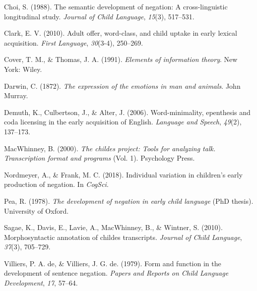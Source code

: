 \documentclass[10pt, letterpaper]{article}
\begin{document}
\leavevmode\hypertarget{ref-choi1988semantic}{}%
Choi, S. (1988). The semantic development of negation: A
cross-linguistic longitudinal study. \emph{Journal of Child Language},
\emph{15}(3), 517--531.

\leavevmode\hypertarget{ref-clark2010adult}{}%
Clark, E. V. (2010). Adult offer, word-class, and child uptake in early
lexical acquisition. \emph{First Language}, \emph{30}(3-4), 250--269.

\leavevmode\hypertarget{ref-cover_elements_1991}{}%
Cover, T. M., \& Thomas, J. A. (1991). \emph{Elements of information
theory}. New York: Wiley.

\leavevmode\hypertarget{ref-darwin1872expression}{}%
Darwin, C. (1872). \emph{The expression of the emotions in man and
animals}. John Murray.

\leavevmode\hypertarget{ref-demuth2006word}{}%
Demuth, K., Culbertson, J., \& Alter, J. (2006). Word-minimality,
epenthesis and coda licensing in the early acquisition of English.
\emph{Language and Speech}, \emph{49}(2), 137--173.

\leavevmode\hypertarget{ref-macwhinney2000childes}{}%
MacWhinney, B. (2000). \emph{The childes project: Tools for analyzing
talk. Transcription format and programs} (Vol. 1). Psychology Press.

\leavevmode\hypertarget{ref-nordmeyer2018individual}{}%
Nordmeyer, A., \& Frank, M. C. (2018). Individual variation in
children's early production of negation. In \emph{CogSci}.

\leavevmode\hypertarget{ref-pea1978}{}%
Pea, R. (1978). \emph{The development of negation in early child
language} (PhD thesis). University of Oxford.

\leavevmode\hypertarget{ref-sagae2010morphosyntactic}{}%
Sagae, K., Davis, E., Lavie, A., MacWhinney, B., \& Wintner, S. (2010).
Morphosyntactic annotation of childes transcripts. \emph{Journal of
Child Language}, \emph{37}(3), 705--729.

\leavevmode\hypertarget{ref-de1979form}{}%
Villiers, P. A. de, \& Villiers, J. G. de. (1979). Form and function in
the development of sentence negation. \emph{Papers and Reports on Child
Language Development}, \emph{17}, 57--64.


\end{document}
